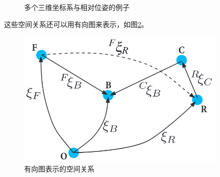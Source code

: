 \documentclass[UTF8,a4paper,10pt]{ctexart}
\begin{document}
\begin{itemize}
\begin{figure}[htbp]
  \caption{多个三维坐标系与相对位姿的例子}
  \label{fig:multiple_frame_pose}
\end{figure}
这些空间关系还可以用有向图来表示，如图\ref{fig:pose_directed_graph}。
\begin{figure}[htbp]
  \centerline{\includegraphics[width=0.9\textwidth]{pose_directed_graph}}
  \caption{有向图表示的空间关系}
  \label{fig:pose_directed_graph}
\end{figure}
  

\end{itemize}
\end{document}
